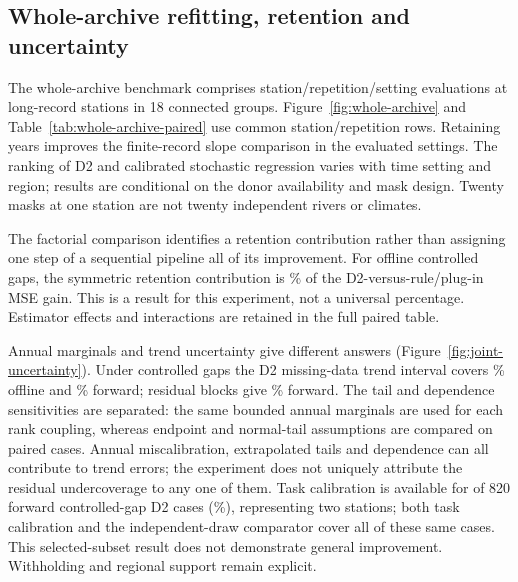 \subsection{Whole-archive refitting, retention and uncertainty}
The whole-archive benchmark comprises \WARepetitions{} station/repetition/setting evaluations at \WAStations{} long-record stations in 18 connected groups. Figure~\ref{fig:whole-archive} and Table~\ref{tab:whole-archive-paired} use common station/repetition rows. Retaining years improves the finite-record slope comparison in the evaluated settings. The ranking of D2 and calibrated stochastic regression varies with time setting and region; results are conditional on the donor availability and mask design. Twenty masks at one station are not twenty independent rivers or climates.

The factorial comparison identifies a retention contribution rather than assigning one step of a sequential pipeline all of its improvement. For offline controlled gaps, the symmetric retention contribution is \WARetentionShare\% of the D2-versus-rule/plug-in MSE gain. This is a result for this experiment, not a universal percentage. Estimator effects and interactions are retained in the full paired table.

Annual marginals and trend uncertainty give different answers (Figure~\ref{fig:joint-uncertainty}). Under controlled gaps the D2 missing-data trend interval covers \WAOfflineCoverage\% offline and \WAForwardCoverage\% forward; residual blocks give \WABlockForwardCoverage\% forward. The tail and dependence sensitivities are separated: the same bounded annual marginals are used for each rank coupling, whereas endpoint and normal-tail assumptions are compared on paired cases. Annual miscalibration, extrapolated tails and dependence can all contribute to trend errors; the experiment does not uniquely attribute the residual undercoverage to any one of them. Task calibration is available for \WATaskForwardN{} of 820 forward controlled-gap D2 cases (\WATaskForwardPercent\%), representing two stations; both task calibration and the independent-draw comparator cover all of these same cases. This selected-subset result does not demonstrate general improvement. Withholding and regional support remain explicit.

